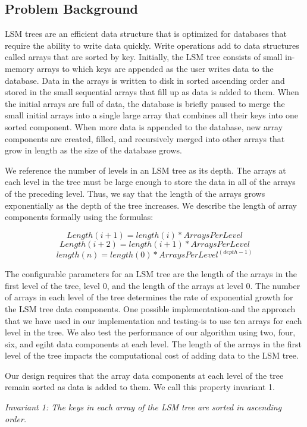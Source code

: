 \documentclass[10pt,twocolumn]{article}
\begin{document}
\subsection{Problem Background}
LSM trees are an efficient data structure that is optimized for databases that require the ability to write data quickly.  Write operations add to data structures called arrays that are sorted by key.  Initially, the LSM tree consists of small in-memory arrays to which keys are appended as the user writes data to the database.  Data in the arrays is written to disk in sorted ascending order and stored in the small sequential arrays that fill up as data is added to them.  When the initial arrays are full of data, the database is briefly paused to merge the small initial arrays into a single large array that combines all their keys into one sorted component.  When more data is appended to the database, new array components are created, filled, and recursively merged into other arrays that grow in length as the size of the database grows.

We reference the number of levels in an LSM tree as its depth.  The arrays at each level in the tree must be large enough to store the data in all of the arrays of the preceding level.  Thus, we say that the length of the arrays grows exponentially as the depth of the tree increases.  We describe the length of array components formally using the formulas:

$$Length(i+1) = length(i) * ArraysPerLevel$$
$$Length(i+2) = length(i+1) * ArraysPerLevel$$
$$length(n) = length(0) * ArraysPerLevel^(depth-1)$$

The configurable parameters for an LSM tree are the length of the arrays in the first level of the tree, level 0, and the length of the arrays at level 0.  The number of arrays in each level of the tree determines the rate of exponential growth for the LSM tree data components.  One possible implementation-and the approach that we have used in our implementation and testing-is to use ten arrays for each level in the tree.  We also test the performance of our algorithm using two, four, six, and egiht data components at each level.  The length of the arrays in the first level of the tree impacts the computational cost of adding data to the LSM tree.

Our design requires that the array data components at each level of the tree remain sorted as data is added to them.  We call this property invariant 1.

\textit{Invariant 1: The keys in each array of the LSM tree are sorted in ascending order.}
\end{document}
